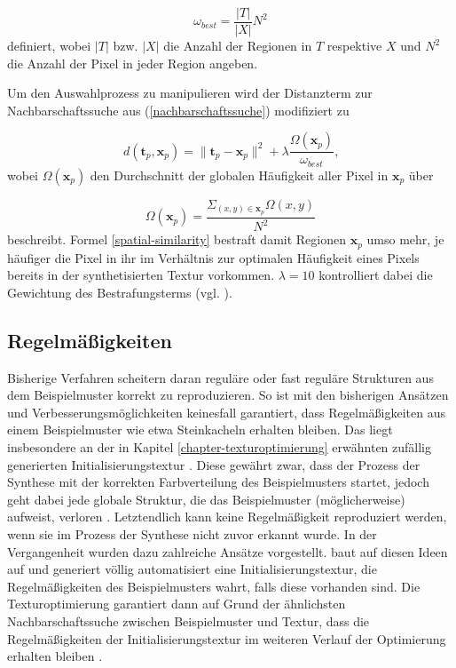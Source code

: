 \begin{equation*}
	\omega_{\textit{best}} = \frac{|T|}{|X|}N^2
\end{equation*}
definiert, wobei $|T|$ bzw. $|X|$ die Anzahl der Regionen in $T$ respektive $X$ und $N^2$ die Anzahl der Pixel in jeder Region angeben.

Um den Auswahlprozess zu manipulieren wird der Distanzterm zur Nachbarschaftssuche aus (\ref{nachbarschaftssuche}) modifiziert zu

\begin{equation}
	d(\textbf{t}_p, \textbf{x}_p) = \lVert \textbf{t}_p - \textbf{x}_p \rVert^2 + \lambda \frac{\Omega(\textbf{x}_p)}{\omega_{\textit{best}}}\text{,}
	\label{spatial-similarity}
\end{equation}
wobei $\Omega(\textbf{x}_p)$ den Durchschnitt der globalen Häufigkeit aller Pixel in $\textbf{x}_p$ über

\begin{equation*}
	\Omega(\textbf{x}_p) = \frac{\Sigma_{(x,y) \in \textbf{x}_p}\Omega(x,y)}{N^2}
\end{equation*}
beschreibt.
Formel \ref{spatial-similarity} bestraft damit Regionen $\textbf{x}_p$ umso mehr, je häufiger die Pixel in ihr im Verhältnis zur optimalen Häufigkeit eines Pixels bereits in der synthetisierten Textur vorkommen.
$\lambda = 10$ kontrolliert dabei die Gewichtung des Bestrafungsterms (vgl. \cite{SelfTuning}).

\subsection{Regelmäßigkeiten}

Bisherige Verfahren scheitern daran reguläre oder fast reguläre Strukturen aus dem Beispielmuster korrekt zu reproduzieren.
So ist mit den bisherigen Ansätzen und Verbesserungsmöglichkeiten keinesfall garantiert, dass Regelmäßigkeiten aus einem Beispielmuster wie etwa Steinkacheln erhalten bleiben.
Das liegt insbesondere an der in Kapitel \ref{chapter-texturoptimierung} erwähnten zufällig generierten Initialisierungstextur \cite{SelfTuning}.
Diese gewährt zwar, dass der Prozess der Synthese mit der korrekten Farbverteilung des Beispielmusters startet, jedoch geht dabei jede globale Struktur, die das Beispielmuster (möglicherweise) aufweist, verloren \cite{SelfTuning}.
Letztendlich kann keine Regelmäßigkeit reproduziert werden, wenn sie im Prozess der Synthese nicht zuvor erkannt wurde.
In der Vergangenheit wurden dazu zahlreiche Ansätze vorgestellt.
\cite{SelfTuning} baut auf diesen Ideen auf und generiert völlig automatisiert eine  Initialisierungstextur, die Regelmäßigkeiten des Beispielmusters wahrt, falls diese vorhanden sind.
Die Texturoptimierung garantiert dann auf Grund der ähnlichsten Nachbarschaftssuche zwischen Beispielmuster und Textur, dass die Regelmäßigkeiten der Initialisierungstextur im weiteren Verlauf der Optimierung erhalten bleiben \cite{SelfTuning}.

